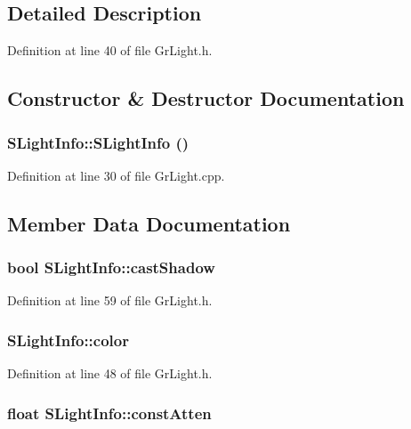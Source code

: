 \subsection{Detailed Description}


Definition at line 40 of file GrLight.h.

\subsection{Constructor \& Destructor Documentation}
\hypertarget{struct_s_light_info_aff77c5ffbedfdbf8ff411ceba710ce3}{
\subsubsection[{SLightInfo}]{\setlength{\rightskip}{0pt plus 5cm}SLightInfo::SLightInfo ()}}
\label{struct_s_light_info_aff77c5ffbedfdbf8ff411ceba710ce3}




Definition at line 30 of file GrLight.cpp.

\subsection{Member Data Documentation}
\hypertarget{struct_s_light_info_1751091736d0b2681bdcb93e78ed9441}{
\subsubsection[{castShadow}]{\setlength{\rightskip}{0pt plus 5cm}bool {\bf SLightInfo::castShadow}}}
\label{struct_s_light_info_1751091736d0b2681bdcb93e78ed9441}




Definition at line 59 of file GrLight.h.\hypertarget{struct_s_light_info_dd473b66bc8d906709a0b6cac00b1cf5}{
\subsubsection[{color}]{ {\bf SLightInfo::color}}}
\label{struct_s_light_info_dd473b66bc8d906709a0b6cac00b1cf5}




Definition at line 48 of file GrLight.h.\hypertarget{struct_s_light_info_926cc2b70cbc204a58b7eedc7c6d323e}{
\subsubsection[{constAtten}]{\setlength{\rightskip}{0pt plus 5cm}float {\bf SLightInfo::constAtten}}}
\label{struct_s_light_info_926cc2b70cbc204a58b7eedc7c6d323e}




